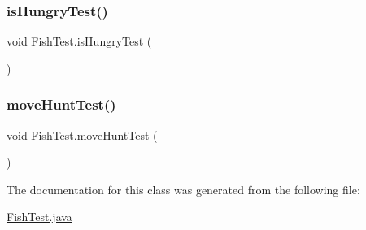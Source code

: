 \subsubsection{\texorpdfstring{is\+Hungry\+Test()}{isHungryTest()}}
{\footnotesize\ttfamily void Fish\+Test.\+is\+Hungry\+Test (\begin{DoxyParamCaption}{ }\end{DoxyParamCaption})\hspace{0.3cm}{\ttfamily [inline]}}

\mbox{\label{class_fish_test_ac85858cd7b8d49b0490e4ef1221e3bef}} 
\subsubsection{\texorpdfstring{move\+Hunt\+Test()}{moveHuntTest()}}
{\footnotesize\ttfamily void Fish\+Test.\+move\+Hunt\+Test (\begin{DoxyParamCaption}{ }\end{DoxyParamCaption})\hspace{0.3cm}{\ttfamily [inline]}}



The documentation for this class was generated from the following file\+:\begin{DoxyCompactItemize}
\item 
\mbox{\hyperlink{_fish_test_8java}{Fish\+Test.\+java}}\end{DoxyCompactItemize}
